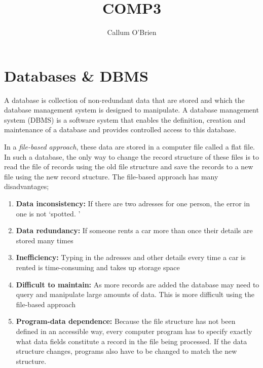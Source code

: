 \documentclass{article}
\title{COMP3}
\author{Callum O'Brien}
\begin{document}
\maketitle
\tableofcontents

\newpage

\section{Databases \& DBMS}

A database is collection of non-redundant data that are stored and which the
database management system is designed to manipulate. A database management
system (DBMS) is a software system that enables the definition, creation and
maintenance of a database and provides controlled access to this database.

In a \textit{file-based approach}, these data are stored in a computer file
called a flat file. In such a database, the only way to change the record
structure of these files is to read the file of records using the old file
structure and save the records to a new file using the new record stucture. The
file-based approach has many disadvantages;\begin{enumerate}
    
    \item \textbf{Data inconsistency:} If there are two adresses for one person,
        the error in one is not `spotted.  '

    \item \textbf{Data redundancy:} If someone rents a car more than once their
        details are stored many times

    \item \textbf{Inefficiency:} Typing in the adresses and other details every
        time a car is rented is time-consuming and takes up storage space

    \item \textbf{Difficult to maintain:} As more records are added the database
        may need to query and manipulate large amounts of data. This is more
        difficult using the file-based approach
        
    \item \textbf{Program-data dependence:} Because the file structure has not
        been defined in an accessible way, every computer program has to specify
        exactly what data fields constitute a record in the file being
        processed. If the data structure changes, programs also have to be
        changed to match the new structure.

\end{enumerate}
\end{document}
